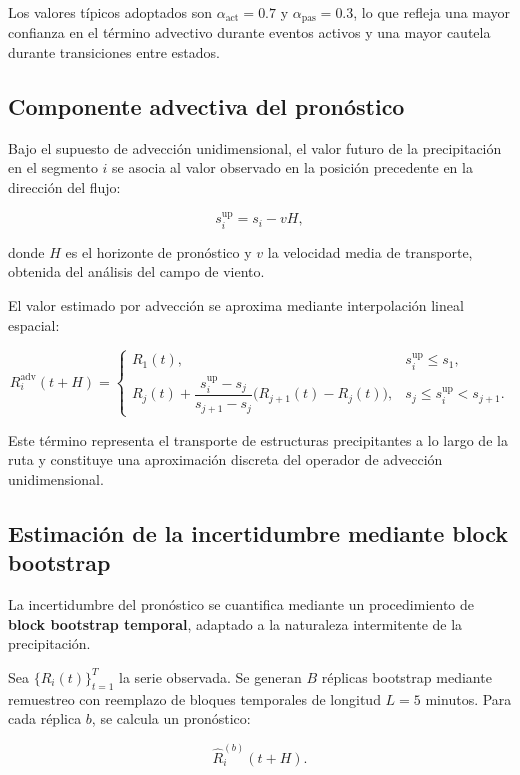 \documentclass[
  spanish,
  us-letterpaper,
]{scrreprt}
\numberwithin{equation}{section}
\begin{document}
Los valores típicos adoptados son \(\alpha_{\text{act}} = 0.7\) y
\(\alpha_{\text{pas}} = 0.3\), lo que refleja una mayor confianza en el
término advectivo durante eventos activos y una mayor cautela durante
transiciones entre estados.

\subsection{Componente advectiva del
pronóstico}\label{componente-advectiva-del-pronuxf3stico-2}

Bajo el supuesto de advección unidimensional, el valor futuro de la
precipitación en el segmento \(i\) se asocia al valor observado en la
posición precedente en la dirección del flujo:

\[
s_i^{\text{up}} = s_i - vH,
\]

donde \(H\) es el horizonte de pronóstico y \(v\) la velocidad media de
transporte, obtenida del análisis del campo de viento.

El valor estimado por advección se aproxima mediante interpolación
lineal espacial:

\[
R_i^{\text{adv}}(t+H) =
\begin{cases}
R_1(t), & s_i^{\text{up}} \le s_1, \\[6pt]
R_j(t) + \dfrac{s_i^{\text{up}} - s_j}{s_{j+1}-s_j}\bigl(R_{j+1}(t)-R_j(t)\bigr), & s_j \le s_i^{\text{up}} < s_{j+1}.
\end{cases}
\]

Este término representa el transporte de estructuras precipitantes a lo
largo de la ruta y constituye una aproximación discreta del operador de
advección unidimensional.

\subsection{Estimación de la incertidumbre mediante block
bootstrap}\label{estimaciuxf3n-de-la-incertidumbre-mediante-block-bootstrap-2}

La incertidumbre del pronóstico se cuantifica mediante un procedimiento
de \textbf{block bootstrap temporal}, adaptado a la naturaleza
intermitente de la precipitación.

Sea \(\{R_i(t)\}_{t=1}^T\) la serie observada. Se generan \(B\) réplicas
bootstrap mediante remuestreo con reemplazo de bloques temporales de
longitud \(L = 5\) minutos. Para cada réplica \(b\), se calcula un
pronóstico:

\[
\hat{R}_i^{(b)}(t+H).
\]
\end{document}
